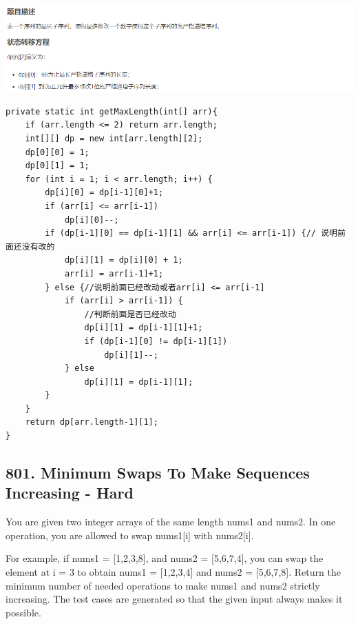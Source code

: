 \documentclass[9pt, b5paaper]{book}
\begin{document}
\includegraphics[width=.9\linewidth]{./pic/dpArray3.png}
\begin{verbatim}
private static int getMaxLength(int[] arr){
    if (arr.length <= 2) return arr.length;
    int[][] dp = new int[arr.length][2];
    dp[0][0] = 1;
    dp[0][1] = 1;
    for (int i = 1; i < arr.length; i++) {
        dp[i][0] = dp[i-1][0]+1;
        if (arr[i] <= arr[i-1])
            dp[i][0]--;
        if (dp[i-1][0] == dp[i-1][1] && arr[i] <= arr[i-1]) {// 说明前面还没有改的
            dp[i][1] = dp[i][0] + 1;
            arr[i] = arr[i-1]+1;
        } else {//说明前面已经改动或者arr[i] <= arr[i-1]
            if (arr[i] > arr[i-1]) {
                //判断前面是否已经改动
                dp[i][1] = dp[i-1][1]+1;
                if (dp[i-1][0] != dp[i-1][1]) 
                    dp[i][1]--;
            } else
                dp[i][1] = dp[i-1][1];
        }
    }
    return dp[arr.length-1][1];
}
\end{verbatim}

\subsection{801. Minimum Swaps To Make Sequences Increasing - Hard}
\label{sec-1-2-7}
You are given two integer arrays of the same length nums1 and nums2. In one operation, you are allowed to swap nums1[i] with nums2[i].

For example, if nums1 = [1,2,3,8], and nums2 = [5,6,7,4], you can swap the element at i = 3 to obtain nums1 = [1,2,3,4] and nums2 = [5,6,7,8].
Return the minimum number of needed operations to make nums1 and nums2 strictly increasing. The test cases are generated so that the given input always makes it possible.
\end{document}

